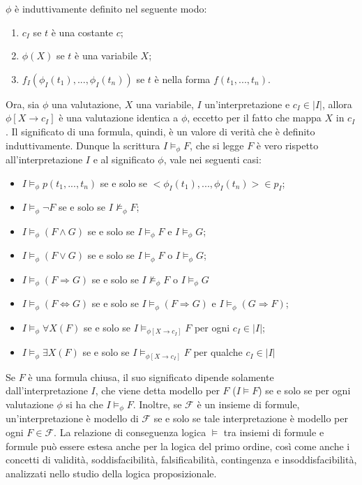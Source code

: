 \break

\noindent \(\phi\) è induttivamente definito nel seguente modo:
\begin{enumerate}
  \item \(c_I\) se \(t\) è una costante \(c\);
  \item \(\phi(X)\) se \(t\) è una variabile \(X\);
  \item \(f_I(\phi_I(t_1),...,\phi_I(t_n))\) se \(t\) è nella forma \(f(t_1,...,t_n)\).
\end{enumerate}
Ora, sia \(\phi\) una valutazione, \(X\) una variabile, \(I\) un'interpretazione e \(c_I\in |I|\), allora \(\phi[X\to c_I]\) è una valutazione identica a \(\phi\), eccetto per il fatto che mappa \(X\) in \(c_I\). Il significato di una formula, quindi, è un valore di verità che è definito induttivamente. Dunque la scrittura \(I \vDash_\phi F\), che si legge \(F\) è vero rispetto all'interpretazione \(I\) e al significato \(\phi\), vale nei seguenti casi:
\begin{itemize}
  \item \(I \vDash_\phi p(t_1,...,t_n)\) se e solo se \(<\phi_I(t_1),..., \phi_I(t_n)>\in p_I\);
  \item \(I \vDash_\phi \lnot F\) se e solo se \(I\nvDash_\phi F\);
  \item \(I \vDash_\phi (F\wedge G)\) se e solo se \(I \vDash_\phi F\) e \(I \vDash_\phi G\);
  \item \(I \vDash_\phi (F \vee G)\) se e solo se \(I \vDash_\phi F\) o \(I \vDash_\phi G\);
  \item \(I \vDash_\phi (F \Rightarrow G)\) se e solo se \(I\nvDash_\phi F\) o \(I\vDash_\phi G\)
  \item \(I \vDash_\phi (F \Leftrightarrow G)\) se e solo se \(I \vDash_\phi (F \Rightarrow G)\) e \(I\vDash_\phi (G \Rightarrow F)\);
  \item \(I\vDash_\phi\forall X(F)\) se e solo se \(I \vDash_{\phi[X\to c_I]} F\) per ogni \(c_I\in |I|\);
  \item \(I\vDash_\phi\exists X(F)\) se e solo se \(I \vDash_{\phi[X\to c_I]} F\) per qualche \(c_I\in |I|\)
\end{itemize}

Se \(F\) è una formula chiusa, il suo significato dipende solamente dall'interpretazione \(I\), che viene detta modello per \(F\) (\(I\vDash F\)) se e solo se per ogni valutazione \(\phi\) si ha che \(I\vDash_\phi F\). Inoltre, se \(\mathcal F\) è un insieme di formule, un'interpretazione è modello di \(\mathcal F\) se e solo se tale interpretazione è modello per ogni \(F \in \mathcal F\). La relazione di conseguenza logica \(\vDash\) tra insiemi di formule e formule può essere estesa anche per la logica del primo ordine, così come anche i concetti di validità, soddisfacibilità, falsificabilità, contingenza e insoddisfacibilità, analizzati nello studio della logica proposizionale.  

